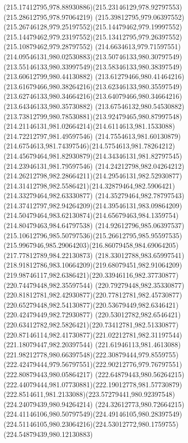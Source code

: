 {{		\curveto(215.17412795,978.88930886)(215.23146129,978.92797553)(215.28612795,978.97064219)
		\curveto(215.39812795,979.06397552)(215.26746128,979.25197552)(215.14479462,979.19997552)
		\curveto(215.14479462,979.23197552)(215.13412795,979.26397552)(215.10879462,979.28797552)
		\curveto(214.6634613,979.71597551)(214.09546131,980.02530883)(213.50746133,980.30797549)
		\curveto(213.55146133,980.33997549)(213.58346133,980.38397549)(213.60612799,980.44130882)
		\curveto(213.61279466,980.41464216)(213.61679466,980.38264216)(213.62346133,980.35597549)
		\curveto(213.62746133,980.34664216)(213.64079466,980.34664216)(213.64346133,980.35730882)
		\curveto(213.67546132,980.54530882)(213.73812799,980.78530881)(213.92479465,980.87997548)
		\curveto(214.21146131,981.02664214)(214.6114613,981.1533088)(214.72212797,981.49597546)
		\curveto(214.7554613,981.60130879)(214.6754613,981.74397546)(214.5754613,981.78264212)
		\curveto(214.45679464,981.82930879)(214.34346131,981.82797545)(214.23946131,981.79597546)
		\curveto(214.24212798,982.04264212)(214.26212798,982.28664211)(214.29546131,982.52930877)
		\curveto(214.31412798,982.5586421)(214.32879464,982.5906421)(214.33279464,982.63330877)
		\curveto(214.35279464,982.78797543)(214.37412797,982.94264209)(214.39546131,983.09864209)
		\curveto(214.50479464,983.62130874)(214.65679463,984.1359754)(214.80479463,984.64797538)
		\curveto(214.92612796,985.06397537)(215.10612796,985.50797536)(215.26612795,985.95597535)
		\curveto(215.9967946,985.29064203)(216.86079458,984.69064205)(217.77812789,984.22130873)
		\curveto(218.33012788,983.65997541)(218.91812786,983.10664209)(219.68079451,982.91064209)
		\curveto(219.98746117,982.6386421)(220.33946116,982.37730877)(220.74479448,982.35597544)
		\curveto(220.79279448,982.35330877)(220.81812781,982.42930877)(220.77812781,982.45730877)
		\curveto(220.65279448,982.54130877)(220.53679449,982.6346421)(220.42479449,982.72930877)
		\curveto(220.53012782,982.6546421)(220.63412782,982.5826421)(220.73412781,982.51330877)
		\curveto(220.87146114,982.41730877)(221.02212781,982.31197544)(221.18079447,982.20397544)
		\curveto(221.61946113,981.4613088)(221.98212778,980.66397548)(222.30879444,979.8559755)
		\curveto(222.42479444,979.56797551)(222.90212776,979.76797551)(222.80879443,980.05864217)
		\curveto(222.64879443,980.56264215)(222.44079444,981.07730881)(222.19012778,981.57730879)
		\curveto(222.8514611,981.2133088)(223.57279441,980.92397548)(224.24079439,980.94264214)
		\curveto(224.32612773,980.72664215)(224.41146106,980.50797549)(224.49146105,980.28397549)
		\curveto(224.51146105,980.23064216)(224.53012772,980.1759755)(224.54879439,980.12130883)
}}
